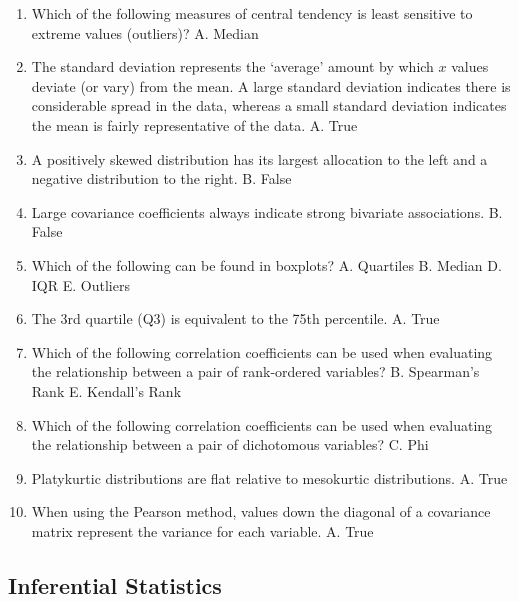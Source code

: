 \documentclass[]{book}
\begin{document}
\begin{enumerate}
\def\labelenumi{\arabic{enumi}.}
\item
  Which of the following measures of central tendency is least sensitive to extreme values (outliers)?
  A. Median
\item
  The standard deviation represents the `average' amount by which \(x\) values deviate (or vary) from the mean. A large standard deviation indicates there is considerable spread in the data, whereas a small standard deviation indicates the mean is fairly representative of the data.
  A. True
\item
  A positively skewed distribution has its largest allocation to the left and a negative distribution to the right.
  B. False
\item
  Large covariance coefficients always indicate strong bivariate associations.
  B. False
\item
  Which of the following can be found in boxplots?
  A. Quartiles
  B. Median
  D. IQR
  E. Outliers
\item
  The 3rd quartile (Q3) is equivalent to the 75th percentile.
  A. True
\item
  Which of the following correlation coefficients can be used when evaluating the relationship between a pair of rank-ordered variables?
  B. Spearman's Rank
  E. Kendall's Rank
\item
  Which of the following correlation coefficients can be used when evaluating the relationship between a pair of dichotomous variables?
  C. Phi
\item
  Platykurtic distributions are flat relative to mesokurtic distributions.
  A. True
\item
  When using the Pearson method, values down the diagonal of a covariance matrix represent the variance for each variable.
  A. True
\end{enumerate}

\hypertarget{inferential-statistics}{%
\subsection{Inferential Statistics}\label{inferential-statistics}}
\end{document}

